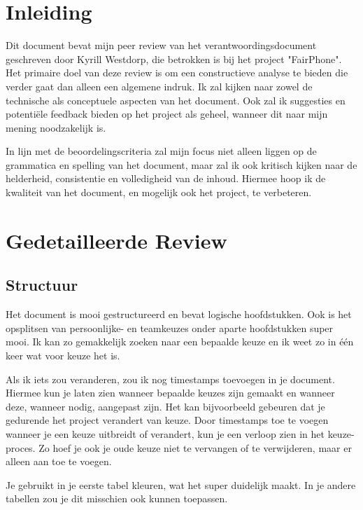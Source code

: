 \documentclass[a4paper]{report}
\begin{document}
\tableofcontents

\chapter{Inleiding}
Dit document bevat mijn peer review van het verantwoordingsdocument geschreven door Kyrill Westdorp, die betrokken is bij het project "FairPhone". 
Het primaire doel van deze review is om een constructieve analyse te bieden die verder gaat dan alleen een algemene indruk. 
Ik zal kijken naar zowel de technische als conceptuele aspecten van het document. Ook zal ik suggesties en potentiële feedback bieden op het project als geheel, wanneer dit naar mijn mening noodzakelijk is.
\par \smallskip
In lijn met de beoordelingscriteria zal mijn focus niet alleen liggen op de grammatica en spelling van het document, maar zal ik ook kritisch kijken naar de helderheid, consistentie en volledigheid van de inhoud.
Hiermee hoop ik de kwaliteit van het document, en mogelijk ook het project, te verbeteren.


\chapter{Gedetailleerde Review}
\section{Structuur}
Het document is mooi gestructureerd en bevat logische hoofdstukken.
Ook is het opsplitsen van persoonlijke- en teamkeuzes onder aparte hoofdstukken super mooi.
Ik kan zo gemakkelijk zoeken naar een bepaalde keuze en ik weet zo in één keer wat voor keuze het is.
\par\smallskip 
Als ik iets zou veranderen, zou ik nog timestamps toevoegen in je document.
Hiermee kun je laten zien wanneer bepaalde keuzes zijn gemaakt en wanneer deze, wanneer nodig, aangepast zijn.
Het kan bijvoorbeeld gebeuren dat je gedurende het project verandert van keuze. 
Door timestamps toe te voegen wanneer je een keuze uitbreidt of verandert, kun je een verloop zien in het keuze-proces. 
Zo hoef je ook je oude keuze niet te vervangen of te verwijderen, maar er alleen aan toe te voegen. 
\par\smallskip 
Je gebruikt in je eerste tabel kleuren, wat het super duidelijk maakt. In je andere tabellen zou je dit misschien ook kunnen toepassen.
\end{document}
